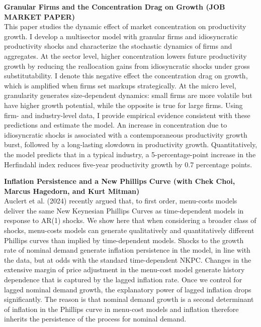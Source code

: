 \documentclass[a4paper,12pt]{article}
\begin{document}
\noindent\textbf{Granular Firms and the Concentration Drag on Growth (JOB MARKET PAPER)}\\
This paper studies the dynamic effect of market concentration on productivity growth. I develop a multisector model with granular firms and idiosyncratic productivity shocks and characterize the stochastic dynamics of firms and aggregates. At the sector level, higher concentration lowers future productivity growth by reducing the reallocation gains from idiosyncratic shocks under gross substitutability. I denote this negative effect the concentration drag on growth, which is amplified when firms set markups strategically. At the micro level, granularity generates size-dependent dynamics: small firms are more volatile but have higher growth potential, while the opposite is true for large firms. Using firm- and industry-level data, I provide empirical evidence consistent with these predictions and estimate the model. An increase in concentration due to idiosyncratic shocks is associated with a contemporaneous productivity growth burst, followed by a long-lasting slowdown in productivity growth. Quantitatively, the model predicts that in a typical industry, a 5-percentage-point increase in the Herfindahl index reduces five-year productivity growth by 0.7 percentage points.

\vspace{0.75em}
\noindent\textbf{Inflation Persistence and a New Phillips Curve (with Chek Choi, Marcus Hagedorn, and Kurt Mitman)}\\
Auclert et al. (2024) recently argued that, to first order, menu-costs models deliver the same New Keynesian Phillips Curves as time-dependent models in response to AR(1) shocks. We show here that when considering a broader class of shocks, menu-costs models can generate qualitatively and quantitatively different Phillips curves than implied by time-dependent models. Shocks to the growth rate of nominal demand generate inflation persistence in the model, in line with the data, but at odds with the standard time-dependent NKPC. Changes in the extensive margin of price adjustment in the menu-cost model generate history dependence that is captured by the lagged inflation rate. Once we control for lagged nominal demand growth, the explanatory power of lagged inflation drops significantly. The reason is that nominal demand growth is a second determinant of inflation in the Phillips curve in menu-cost models and inflation therefore inherits the persistence of the process for nominal demand.
\end{document}
